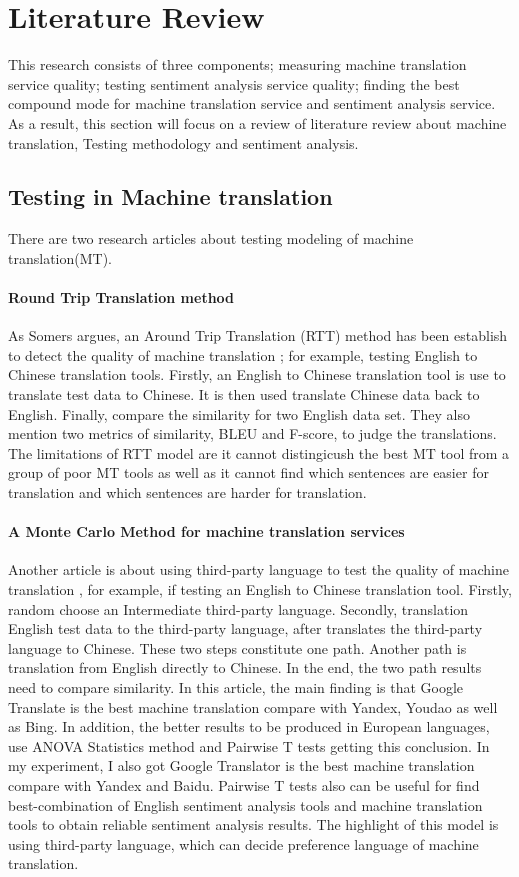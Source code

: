 \documentclass[conference]{IEEEtran}
\begin{document}
\section{Literature Review}
This research consists of three components; measuring machine translation
service quality; testing sentiment analysis service quality;
finding the best compound mode for machine translation service and
sentiment analysis service.
As a result, this section will focus on a review of literature review about machine
translation, Testing methodology and sentiment analysis.
\subsection{Testing in Machine translation}
There are two research articles about testing modeling of machine
translation(MT).

\paragraph{Round Trip Translation method}
As Somers argues, an Around Trip Translation (RTT) method has been establish to
detect the quality of machine translation \cite{roundTripTranslation}; for example, testing English to Chinese translation tools.
Firstly, an English to Chinese translation tool is use to translate test data to
Chinese. It is then used translate Chinese data back to English.
Finally, compare the similarity for two English data set.
They also mention two metrics of similarity, BLEU and F-score, to judge the
translations. The limitations of RTT model are it cannot distingicush the best
MT tool from a group of poor MT tools as well as it cannot find which sentences are easier for
translation and which sentences are harder for translation.

\paragraph{A Monte Carlo Method for machine translation services}
Another article is about using third-party language to test the quality of machine
translation \cite{thirdPartMachineTranslation}, for example, if testing an English to Chinese translation tool.
Firstly, random choose an Intermediate third-party language.
Secondly, translation English test data to the third-party language, after
translates the third-party language to Chinese.
These two steps constitute one path.
Another path is translation from English directly to Chinese.
In the end, the two path results need to compare similarity. In this article, the main
finding is that Google Translate is the best machine translation compare with
Yandex, Youdao as well as Bing. In addition,
the better results to be produced in European languages, use ANOVA Statistics method and Pairwise T tests getting this conclusion.
In my experiment, I also got Google Translator is the best machine translation
compare with Yandex and Baidu. Pairwise T tests also can be useful for find best-combination of English
sentiment analysis tools and machine translation tools to obtain reliable
sentiment analysis results. The highlight of this model is using third-party
language, which can decide preference language of machine translation.
\end{document}

